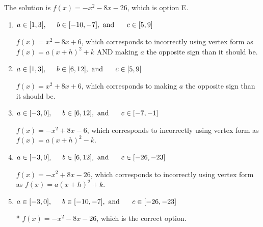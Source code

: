 \documentclass{extbook}[14pt]
\begin{document}
\begin{enumerate}
{The solution is \( f(x) = -x^{2} -8 x -26 \), which is option E.\begin{enumerate}[label=\Alph*.]
\item \( a \in [1, 3], \hspace*{5mm} b \in [-10, -7], \text{ and } \hspace*{5mm} c \in [5, 9] \)

$f(x)=x^{2} -8 x + 6$, which corresponds to incorrectly using vertex form as $f(x) = a(x+h)^2+k$ AND making $a$ the opposite sign than it should be.
\item \( a \in [1, 3], \hspace*{5mm} b \in [6, 12], \text{ and } \hspace*{5mm} c \in [5, 9] \)

$f(x)=x^{2} +8 x + 6$, which corresponds to making $a$ the opposite sign than it should be.
\item \( a \in [-3, 0], \hspace*{5mm} b \in [6, 12], \text{ and } \hspace*{5mm} c \in [-7, -1] \)

$f(x)=-x^{2} +8 x -6$, which corresponds to incorrectly using vertex form as $f(x) = a(x+h)^2 - k$.
\item \( a \in [-3, 0], \hspace*{5mm} b \in [6, 12], \text{ and } \hspace*{5mm} c \in [-26, -23] \)

$f(x)=-x^{2} +8 x -26$, which corresponds to incorrectly using vertex form as $f(x) = a(x+h)^2+k$.
\item \( a \in [-3, 0], \hspace*{5mm} b \in [-10, -7], \text{ and } \hspace*{5mm} c \in [-26, -23] \)

* $f(x)=-x^{2} -8 x -26$, which is the correct option.
\end{enumerate}

}
\end{enumerate}
\end{document}
